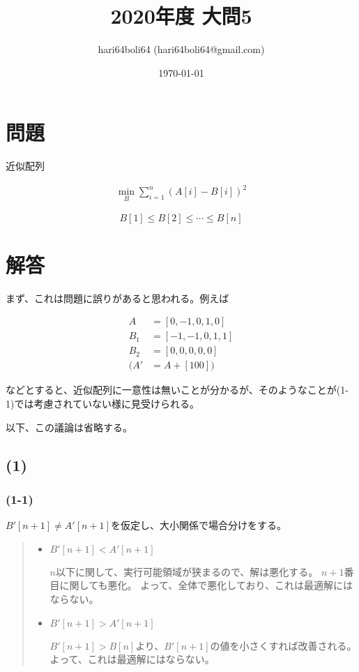 \documentclass[a4paper, 10pt, dvipdfmx]{jlreq}
\begin{document}
\title{2020年度 大問5}
\author{hari64boli64 (hari64boli64@gmail.com)}
\date{\today}
\maketitle


\section{問題}

近似配列

\begin{align*}
    \min_{B} \sum_{i=1}^{n}{(A[i]-B[i])^2}
\end{align*}

$$
    B[1]\leq B[2] \leq \cdots \leq B[n]
$$

\section{解答}

まず、これは問題に誤りがあると思われる。例えば

\begin{align*}
    A   & =[0,-1,0,1,0]  \\
    B_1 & =[-1,-1,0,1,1] \\
    B_2 & =[0,0,0,0,0]   \\
    (A' & =A+[100])
\end{align*}

などとすると、近似配列に一意性は無いことが分かるが、そのようなことが(1-1)では考慮されていない様に見受けられる。

以下、この議論は省略する。

\subsection*{(1)}

\subsubsection*{(1-1)}

$B'[n+1] \neq A'[n+1]$を仮定し、大小関係で場合分けをする。

\begin{quote}
    \begin{itemize}
        \item  $B'[n+1] < A'[n+1]$

              $n$以下に関して、実行可能領域が狭まるので、解は悪化する。
              $n+1$番目に関しても悪化。
              よって、全体で悪化しており、これは最適解にはならない。

        \item  $B'[n+1] > A'[n+1]$

              $B'[n+1]>B[n]$より、$B'[n+1]$の値を小さくすれば改善される。
              よって、これは最適解にはならない。
    \end{itemize}
\end{quote}
\end{document}
